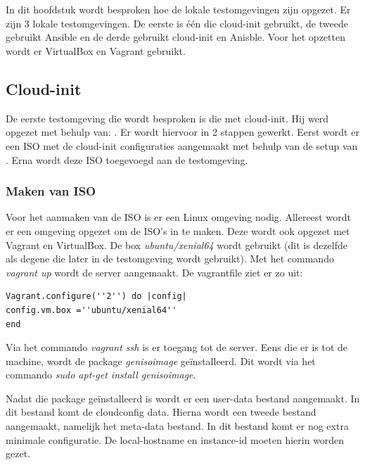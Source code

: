 \chapter{}
\label{ch:testlokaal}

In dit hoofdstuk wordt besproken hoe de lokale testomgevingen zijn opgezet. Er zijn 3 lokale testomgevingen. De eerste is één die cloud-init gebruikt, de tweede gebruikt Ansible en de derde gebruikt cloud-init en Anisble. Voor het opzetten wordt er VirtualBox en Vagrant gebruikt.

\section{Cloud-init}
De eerste testomgeving die wordt besproken is die met cloud-init. Hij werd opgezet met behulp van: \autocite{cloudVagrant}. Er wordt hiervoor in 2 stappen gewerkt. Eerst wordt er een ISO met de cloud-init configuraties aangemaakt met behulp van de setup van \autocite{cloudVagrant}. Erna wordt deze ISO toegevoegd aan de testomgeving.

\subsection{Maken van ISO}
Voor het aanmaken van de ISO is er een Linux omgeving nodig. Allereest wordt er een omgeving opgezet om de ISO's in te maken. Deze wordt ook opgezet met Vagrant en VirtualBox. De box \textit{ubuntu/xenial64} wordt gebruikt (dit is dezelfde als degene die later in de testomgeving wordt gebruikt). Met het commando \textit{vagrant up} wordt de server aangemaakt. De vagrantfile ziet er zo uit:
\begin{lstlisting}
Vagrant.configure(''2'') do |config|
config.vm.box =''ubuntu/xenial64''
end
\end{lstlisting}

Via het commando \textit{vagrant ssh} is er toegang tot de server. Eens die er is tot de machine, wordt de package \textit{genisoimage} geïnstalleerd. Dit wordt via het commando \textit{sudo apt-get install genisoimage}. 

Nadat die package geïnstalleerd is wordt er een user-data bestand aangemaakt. In dit bestand komt de cloudconfig data. Hierna wordt een tweede bestand aangemaakt, namelijk het meta-data bestand. In dit bestand komt er nog extra minimale configuratie. De local-hostname en instance-id moeten hierin worden gezet.

